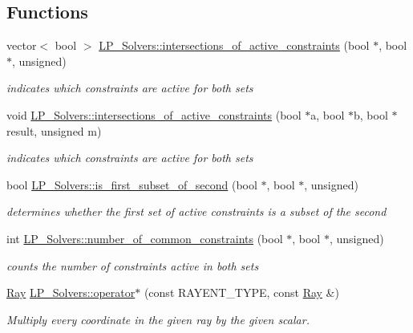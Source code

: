 \subsection*{Functions}
\begin{DoxyCompactItemize}
\item 
vector$<$ bool $>$ \hyperlink{group___c_l_s_solvers_gaf3434d5c281c16ef7a09d8f73445ea00}{L\+P\+\_\+\+Solvers\+::intersections\+\_\+of\+\_\+active\+\_\+constraints} (bool $\ast$, bool $\ast$, unsigned)
\begin{DoxyCompactList}\small\item\em indicates which constraints are active for both sets \end{DoxyCompactList}\item 
void \hyperlink{group___c_l_s_solvers_ga1f87ac127ced7d681b3e51e38eef0cf4}{L\+P\+\_\+\+Solvers\+::intersections\+\_\+of\+\_\+active\+\_\+constraints} (bool $\ast$a, bool $\ast$b, bool $\ast$result, unsigned m)
\begin{DoxyCompactList}\small\item\em indicates which constraints are active for both sets \end{DoxyCompactList}\item 
bool \hyperlink{group___c_l_s_solvers_ga0a997634a9b11bec9c54d0243ac29008}{L\+P\+\_\+\+Solvers\+::is\+\_\+first\+\_\+subset\+\_\+of\+\_\+second} (bool $\ast$, bool $\ast$, unsigned)
\begin{DoxyCompactList}\small\item\em determines whether the first set of active constraints is a subset of the second \end{DoxyCompactList}\item 
int \hyperlink{group___c_l_s_solvers_gad030de457424bef601e2903eb619926e}{L\+P\+\_\+\+Solvers\+::number\+\_\+of\+\_\+common\+\_\+constraints} (bool $\ast$, bool $\ast$, unsigned)
\begin{DoxyCompactList}\small\item\em counts the number of constraints active in both sets \end{DoxyCompactList}\item 
\hyperlink{group___c_l_s_solvers_class_l_p___solvers_1_1_ray}{Ray} \hyperlink{group___c_l_s_solvers_gaf71a7e68f920518b02b6a58660594ca2}{L\+P\+\_\+\+Solvers\+::operator$\ast$} (const R\+A\+Y\+E\+N\+T\+\_\+\+T\+Y\+PE, const \hyperlink{group___c_l_s_solvers_class_l_p___solvers_1_1_ray}{Ray} \&)
\begin{DoxyCompactList}\small\item\em Multiply every coordinate in the given ray by the given scalar. \end{DoxyCompactList}\item 

\end{DoxyCompactItemize}
